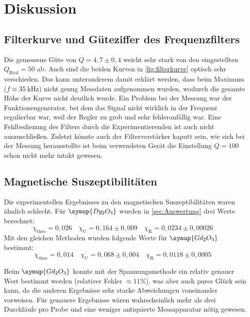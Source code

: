 \section{Diskussion}
\label{sec:Diskussion}

\subsection{Filterkurve und Güteziffer des Frequenzfilters}
\label{sec:Filterkurve und Güteziffer des Frequenzfilters}

Die gemessene Güte von $Q = 4,7 \pm 0,4$ weicht sehr stark von den eingestellten 
$Q_\text{Real} = 50$ ab. Auch sind die beiden Kurven in \autoref{fig:filterkurve} optisch
sehr verschieden. Das kann unteranderem damit erklärt werden, dass beim Maximum ($f
\approx \SI{35}{\kilo\hertz}$) nicht genug Messdaten aufgenommen wurden, wodurch die
gesamte Höhe der Kurve nicht deutlich wurde. Ein Problem bei der Messung war der
Funktionengenerator, bei dem das Signal nicht wirklich in der Frequenz regulierbar war,
weil der Regler zu grob und sehr fehleranfällig war. Eine Fehlbedienung des Filters durch die
Experimentierenden ist auch nicht auszuschließen. Zuletzt könnte auch der Filterverstärker
kaputt sein, wie sich bei der Messung herausstellte ist beim verwendeten Gerät die Einstellung 
$Q = 100$ schon nicht mehr intakt gewesen.

\subsection{Magnetische Suszeptibilitäten}
\label{sec:Magnetische Suszeptibilitäten}

Die experimentellen Ergebnisses zu den magnetischen Suszeptibilitäten waren ähnlich
schlecht. Für $\symup{Dy_2O_3}$ wurden in \autoref{sec:Auswertung} drei Werte berechnet:
\begin{equation}
	\label{eqn:ergebnisse-Dy2O3}
	\chi_\text{theo} = 0,026
	\quad
	\chi_\text{U} = 0,164 \pm 0,009
	\quad
	\chi_\text{R} = 0,0234 \pm 0,00026
	\quad
\end{equation}
Mit den gleichen Methoden wurden folgende Werte für $\symup{Gd_2O_3}$ bestimmt:
\begin{equation}
	\label{eqn:ergebnisse-Gd2O3}
	\chi_\text{theo} = 0,014
	\quad
	\chi_\text{U} = 0,068 \pm 0,004
	\quad
	\chi_\text{R} = 0,0118 \pm 0,0005
	\quad
\end{equation}

Beim $\symup{Gd_2O_3}$ konnte mit der Spannungsmethode
ein relativ genauer Wert bestimmt werden (relativer Fehler $\approx 11\%$),
was aber auch pures Glück sein kann, da die anderen Ergebnisse sehr starke
Abweichungen voneinander vorweisen. 
Für genauere Ergebnisse wären wahrscheinlich mehr als drei Durchläufe pro Probe und eine 
weniger antiquierte Messapparatur nötig gewesen.

